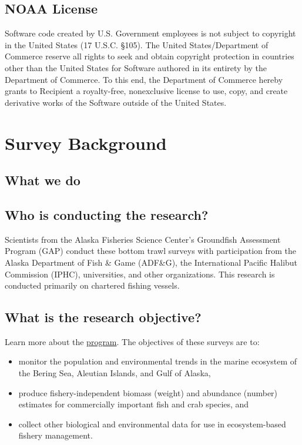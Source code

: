 \documentclass[
  letterpaper,
  oneside,
  open=any]{scrbook}
\providecommand{\tightlist}{%
  \setlength{\itemsep}{0pt}\setlength{\parskip}{0pt}}\usepackage{longtable,booktabs,array}
\begin{document}
\section*{NOAA License}\label{noaa-license}


Software code created by U.S. Government employees is not subject to
copyright in the United States (17 U.S.C. §105). The United
States/Department of Commerce reserve all rights to seek and obtain
copyright protection in countries other than the United States for
Software authored in its entirety by the Department of Commerce. To this
end, the Department of Commerce hereby grants to Recipient a
royalty-free, nonexclusive license to use, copy, and create derivative
works of the Software outside of the United States.

\chapter{Survey Background}\label{survey-background}

\section{What we do}\label{what-we-do}

\section{Who is conducting the
research?}\label{who-is-conducting-the-research}

Scientists from the Alaska Fisheries Science Center's Groundfish
Assessment Program (GAP) conduct these bottom trawl surveys with
participation from the Alaska Department of Fish \& Game (ADF\&G), the
International Pacific Halibut Commission (IPHC), universities, and other
organizations. This research is conducted primarily on chartered fishing
vessels.

\section{What is the research
objective?}\label{what-is-the-research-objective}

Learn more about the
\href{https://www.fisheries.noaa.gov/alaska/science-data/groundfish-assessment-program-bottom-trawl-surveys}{program}.
The objectives of these surveys are to:

\begin{itemize}
\tightlist
\item
  monitor the population and environmental trends in the marine
  ecosystem of the Bering Sea, Aleutian Islands, and Gulf of Alaska,
\item
  produce fishery-independent biomass (weight) and abundance (number)
  estimates for commercially important fish and crab species, and
\item
  collect other biological and environmental data for use in
  ecosystem-based fishery management.
\end{itemize}
\end{document}

